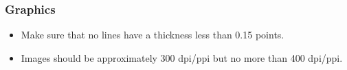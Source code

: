 \subsubsection{Graphics}
\begin{itemize}
    \item Make sure that no lines have a thickness less than 0.15 points.
    \item Images should be approximately 300 dpi/ppi but no more than 400 dpi/ppi.
\end{itemize}
